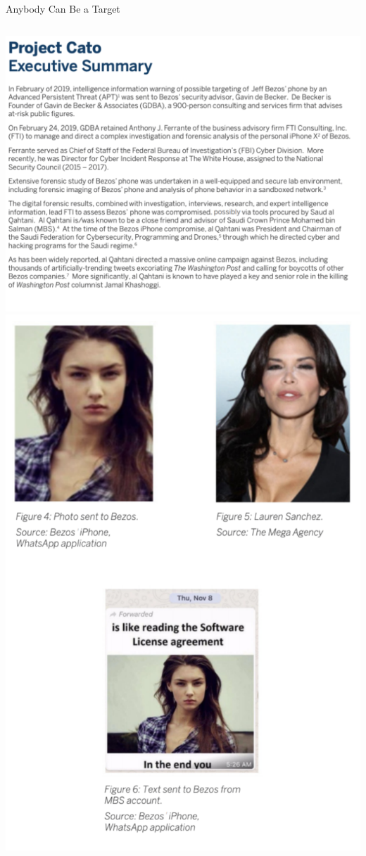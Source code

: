 \documentclass[nobackground,dvipsnames,table]{beamer}
\begin{document}
\begin{frame}{Anybody Can Be a Target}
    \begin{columns}
            \includegraphics[width=\textwidth]{project-cato-executive-summary}
            \includegraphics[width=\textwidth]{project-cato-photos}
    \end{columns}
\end{frame}
\end{document}

